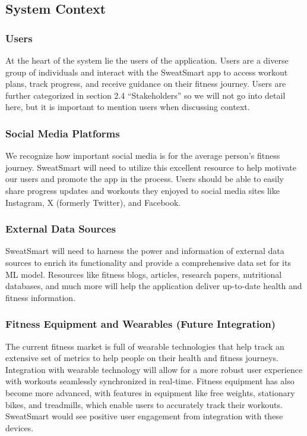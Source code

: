 \documentclass[12pt]{article}
\begin{document}
\subsection{System Context}

\subsubsection{Users}
At the heart of the system lie the users of the application. Users are a diverse group of individuals and interact with the SweatSmart app to access workout plans, track progress, and receive guidance on their fitness journey. Users are further categorized in section 2.4 “Stakeholders” so we will not go into detail here, but it is important to mention users when discussing context.

\subsubsection{Social Media Platforms}
We recognize how important social media is for the average person’s fitness journey. SweatSmart will need to utilize this excellent resource to help motivate our users and promote the app in the process. Users should be able to easily share progress updates and workouts they enjoyed to social media sites like Instagram, X (formerly Twitter), and Facebook.

\subsubsection{External Data Sources}
SweatSmart will need to harness the power and information of external data sources to enrich its functionality and provide a comprehensive data set for its ML model. Resources like fitness blogs, articles, research papers, nutritional databases, and much more will help the application deliver up-to-date health and fitness information.

\subsubsection{Fitness Equipment and Wearables (Future Integration)}
The current fitness market is full of wearable technologies that help track an extensive set of metrics to help people on their health and fitness journeys. Integration with wearable technology will allow for a more robust user experience with workouts seamlessly synchronized in real-time. Fitness equipment has also become more advanced, with features in equipment like free weights, stationary bikes, and treadmills, which enable users to accurately track their workouts. SweatSmart would see positive user engagement from integration with these devices.
\end{document}
